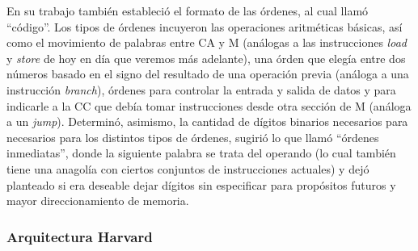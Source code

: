 En su trabajo también estableció el formato de las órdenes, al cual llamó ``código''. Los tipos de órdenes incuyeron las operaciones aritméticas básicas, así como el movimiento de palabras entre CA y M (análogas a las instrucciones \emph{load} y \emph{store} de hoy en día que veremos más adelante), una órden que elegía entre dos números basado en el signo del resultado de una operación previa (análoga a una instrucción \emph{branch}), órdenes para controlar la entrada y salida de datos y para indicarle a la CC que debía tomar instrucciones desde otra sección de M (análoga a un \emph{jump}). Determinó, asimismo, la cantidad de dígitos binarios necesarios para necesarios para los distintos tipos de órdenes, sugirió lo que llamó ``órdenes inmediatas'', donde la siguiente palabra  se trata del operando (lo cual también tiene una anagolía con ciertos conjuntos de instrucciones actuales) y dejó planteado si era deseable dejar dígitos sin especificar para propósitos futuros y mayor direccionamiento de memoria.

\subsubsection{Arquitectura Harvard}

